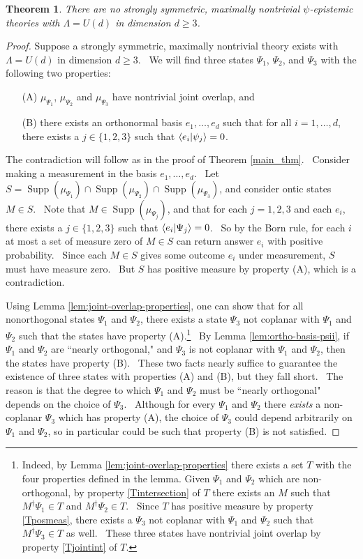\documentclass[letterpaper,12pt]{article}
\newtheorem{thm}{Theorem}
\newcommand{\braket}[2]{\mbox{$ \langle #1 | #2 \rangle $}}
\DeclareMathOperator{\supp}{Supp}
\begin{document}
\begin{thm}
\label{main_thm_unitary}
There are no strongly symmetric, maximally nontrivial $\psi$-epistemic theories with $\Lambda= U(d)$ in dimension $d\geq 3$.
\end{thm}
\begin{proof}


Suppose a strongly symmetric, maximally nontrivial theory exists with $\Lambda= U(d)$ in dimension $d\geq 3$. \ We will find three states $\Psi_1$, $\Psi_2$, and $\Psi_3$ with the following two properties:

\begin{enumerate}
\item[(A)] $\mu_{\Psi_1}$, $\mu_{\Psi_2}$ and $\mu_{\Psi_3}$ have nontrivial joint overlap, and
\item[(B)] there exists an orthonormal basis $e_1, \ldots, e_d$ such that for all $i=1,\ldots, d$, there exists a $j \in \{1,2,3\}$ such that $\braket{e_i}{\psi_j}=0$.
\end{enumerate}

The contradiction will follow as in the proof of Theorem \ref{main_thm}. \ Consider making a measurement in the basis $e_1, \ldots, e_d$. \ Let $S=\supp(\mu_{\Psi_1}) \cap \supp(\mu_{\Psi_2}) \cap \supp(\mu_{\Psi_3})$, and consider ontic states $M\in S$. \ Note that $M\in \supp(\mu_{\Psi_j})$, and that for each $j=1,2,3$ and each $e_i$, there exists a $j \in \{1,2,3\}$ such that $\braket{e_i}{\Psi_j}=0$. \ So by the Born rule, for each $i$ at most a set of measure zero of $M\in S$ can return answer $e_i$ with positive probability. \ Since each $M\in S$ gives some outcome $e_i$ under measurement, $S$ must have measure zero. \ But $S$ has positive measure by property (A), which is a contradiction.

Using Lemma \ref{lem:joint-overlap-properties}, one can show that for all nonorthogonal states $\Psi_1$ and $\Psi_2$, there exists a state $\Psi_3$ not coplanar with $\Psi_1$ and $\Psi_2$ such that the states have property (A).\footnote{Indeed, by Lemma \ref{lem:joint-overlap-properties} there exists a set $T$ with the four properties defined in the lemma. Given $\Psi_1$ and $\Psi_2$ which are non-orthogonal, by property \ref{Tintersection} of $T$ there exists an $M$ such that $M^\dagger \Psi_1 \in T$ and $M^\dagger \Psi_2 \in T$. \ Since $T$ has positive measure by property \ref{Tposmeas}, there exists a $\Psi_3$ not coplanar with $\Psi_1$ and $\Psi_2$ such that $M^\dagger \Psi_3 \in T$ as well. \ These three states have nontrivial joint overlap by property \ref{Tjointint} of $T$.} \ By Lemma \ref{lem:ortho-basis-psii}, if $\Psi_1$ and $\Psi_2$ are ``nearly orthogonal," and $\Psi_3$ is not coplanar with $\Psi_1$ and $\Psi_2$, then the states have property (B). \ These two facts nearly suffice to guarantee the existence of three states with properties (A) and (B), but they fall short. \ The reason is that the degree to which $\Psi_1$ and $\Psi_2$ must be ``nearly orthogonal" depends on the choice of $\Psi_3$. \ Although for every $\Psi_1$ and $\Psi_2$ there \emph{exists} a non-coplanar $\Psi_3$ which has property (A), the choice of $\Psi_3$ could depend arbitrarily on $\Psi_1$ and $\Psi_2$, so in particular could be such that property (B) is not satisfied.


\end{proof}
\end{document}
